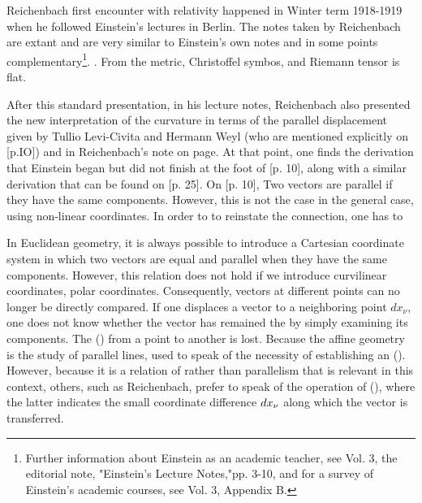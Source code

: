 \documentclass[draft]{article}
\begin{document}
Reichenbach first encounter with relativity happened in Winter term 1918-1919 when he followed Einstein's lectures in Berlin. The notes taken by Reichenbach are extant and are very similar to Einstein's own notes and in some points complementary\footnote{Further information about Einstein as an academic teacher, see Vol. 3, the editorial note, "Einstein's Lecture Notes,"pp. 3-10, and for a survey of Einstein's academic courses, see Vol. 3, Appendix B.}. . From the metric, Christoffel symbos, and Riemann tensor is flat.

After this standard presentation, in his lecture notes, Reichenbach also presented the new interpretation of the curvature in terms of the parallel displacement given by Tullio Levi-Civita and Hermann Weyl (who are mentioned explicitly on [p.IO]) and in Reichenbach's note on page.  At that point, one finds the derivation that Einstein began but did not finish at the foot of [p. 10], along with a similar derivation that can be found on [p. 25]. On [p. 10],  Two vectors are parallel if they have the same components. However, this is not the case in the general case, using non-linear coordinates. In order to to reinstate the connection, one has to 

In Euclidean geometry, it is always possible to introduce a Cartesian coordinate system in which two vectors are equal and parallel when they have the same components. However, this relation does not hold if we introduce curvilinear coordinates, \eg polar coordinates. Consequently, vectors at different points can no longer be directly compared. If one displaces a vector to a neighboring point $dx_\nu$, one does not know whether the vector has remained the  by simply examining its components. The  () from a point to another is lost. Because the affine geometry is the study of parallel lines, \citet{Weyl1918b} used to speak of the necessity of establishing an  (). However, because it is a relation of  rather than parallelism that is relevant in this context, others, such as Reichenbach, prefer to speak of the operation of  (), where the latter indicates the small coordinate difference $dx_{\nu}$ along which the vector is transferred.  
\end{document}
